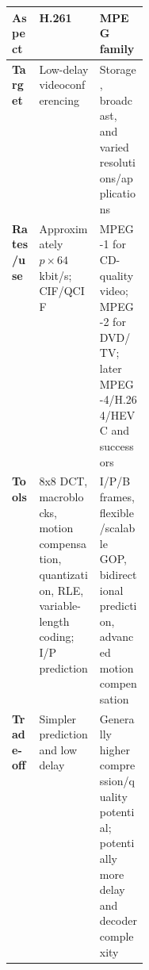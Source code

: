 \documentclass[12pt,a4paper]{article}
\begin{document}
\begin{center}
\begin{tabularx}{\linewidth}{>{\bfseries}p{0.2\linewidth}XX}
\toprule
Aspect & H.261 & MPEG family\\
\midrule
Target & Low-delay videoconferencing & Storage, broadcast, and varied resolutions/applications\\
Rates/use & Approximately \(p\times64\) kbit/s; CIF/QCIF & MPEG-1 for CD-quality video; MPEG-2 for DVD/TV; later MPEG-4/H.264/HEVC and successors\\
Tools & 8x8 DCT, macroblocks, motion compensation, quantization, RLE, variable-length coding; I/P prediction & I/P/B frames, flexible/scalable GOP, bidirectional prediction, advanced motion compensation\\
Trade-off & Simpler prediction and low delay & Generally higher compression/quality potential; potentially more delay and decoder complexity\\
\bottomrule
\end{tabularx}
\end{center}
\end{document}
